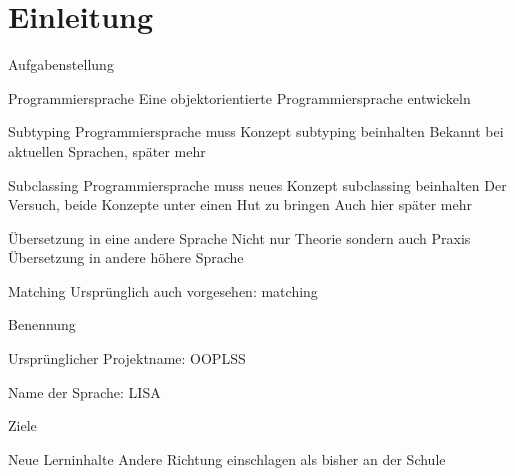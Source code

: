 \section{Einleitung}

\begin{frame}[t]{Aufgabenstellung}
	\begin{bigitemize}[<+->]{3mm}
		\item Programmiersprache
		 {Eine objektorientierte Programmiersprache entwickeln}

		\item Subtyping
		 {Programmiersprache muss Konzept subtyping beinhalten}
		 {Bekannt bei aktuellen Sprachen, später mehr}

		\item Subclassing
		 {Programmiersprache muss neues Konzept subclassing beinhalten}
		 {Der Versuch, beide Konzepte unter einen Hut zu bringen}
		 {Auch hier später mehr}

		\item Übersetzung in eine andere Sprache
		 {Nicht nur Theorie sondern auch Praxis}
		 {Übersetzung in andere höhere Sprache}

		\item Matching
		 {Ursprünglich auch vorgesehen: matching}

	\end{bigitemize}

\end{frame}

\begin{frame}[t]{Benennung}
	\begin{bigitemize}[<+->]{3mm}

		\item Ursprünglicher Projektname: OOPLSS

		\item Name der Sprache: LISA 

	\end{bigitemize}


\end{frame}

\begin{frame}[t]{Ziele}

	\begin{bigitemize}[<+->]{3mm}
		\item Neue Lerninhalte
		 {Andere Richtung einschlagen als bisher an der Schule}
	\end{bigitemize}

\end{frame}
